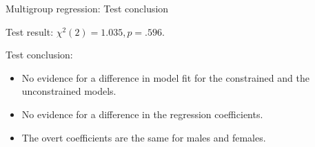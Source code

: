 \documentclass[10pt]{beamer}\usepackage[]{graphicx}\usepackage[]{xcolor}
\begin{document}
%
\begin{frame}{Multigroup regression: Test conclusion}

Test result: $\chi^2(2) = 1.035, p=.596$.

\vspace{5mm}

Test conclusion:
\begin{itemize}
    \item No evidence for a difference in model fit for the constrained and the unconstrained models.
    \item No evidence for a difference in the regression coefficients.
    \item The overt coefficients are the same for males and females.
\end{itemize}

    
\end{frame}
%
% 
%     
%
\end{document}
